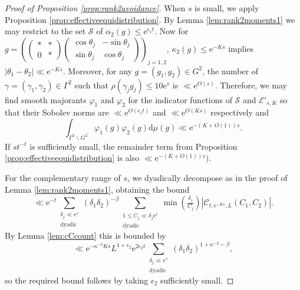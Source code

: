 \documentclass[12pt]{amsart}
\theoremstyle{definition}
\theoremstyle{remark}
\numberwithin{equation}{section}
\newcommand{\dd}{\mathrm{d}}
\newcommand{\e}{\mathrm{e}}
\newcommand{\cC}{\mathcal{C}}
\newcommand{\cE}{\mathcal{E}}
\newcommand{\cS}{\mathcal{S}}
\begin{document}
\begin{proof}[Proof of Proposition \ref{prop:rank2avoidance}]
When $s$ is small, we apply Proposition \ref{prop:effectiveequidistribution}.
By Lemma \ref{lem:rank2moments1} we may restrict to the set $\cS$ of $\alpha_2(g) \leq \e^{\epsilon_1t}$.
Now for $g = \left(
\begin{pmatrix}
  * & * \\
  0 & * 
\end{pmatrix}
\begin{pmatrix}
  \cos \theta_j & -\sin \theta_j \\
  \sin \theta_j & \cos \theta_j
\end{pmatrix}
\right)_{\!\! j=1,2}$, $\kappa_2(g)\leq \e^{-Ks}$ implies $|\theta_1 - \theta_2| \ll \e^{-Ks}$.
Moreover, for any $g = (g_1,g_2) \in G^2$, the number of $\gamma = (\gamma_1, \gamma_2) \in \Gamma^2$ such that $\rho(\gamma_jg_j) \leq 10 \e^s$ is $\ll \e^{O(s)}$.
Therefore, we may find smooth majorants $\varphi_1$ and $\varphi_2$ for the indicator functions of $\cS$ and $\cE'_{s,K}$ so that their Sobolev norms are $\ll \e^{O(\epsilon_1 t)}$ and $\ll \e^{O(K s)}$ respectively and
\begin{equation}
  \label{eq:varphijint}
  \int_{\Gamma^2\backslash G^2} \varphi_1(g)\varphi_2(g) \dd \mu(g) \ll \e^{-(K + O(1))s}.
\end{equation}
If $st^{-t}$ is sufficiently small, the remainder term from Proposition \ref{prop:effectiveequidistribution} is also $\ll\e^{-(K + O(1))s})$.

For the complementary range of $s$, we dyadically decompose as in the proof of Lemma \ref{lem:rank2moments1}, obtaining the bound
\begin{equation}
  \label{eq:avoidancedyadicdecomp}
  \ll \e^{-t}\sum_{\substack{\delta_j \ll \e^s\\ \mathrm{dyadic}}}(\delta_1 \delta_2)^{-\beta} \sum_{\substack{1\leq C_j \ll \delta_j \e^t \\ \mathrm{dyadic}}} \min(\tfrac{\delta_j}{C_j}) |\cC_{t,\e^{-Ks},L}(C_1,C_2)|.
\end{equation}
By Lemma \ref{lem:cCcount} this is bounded by
\begin{equation}
  \label{eq:avoidancedyadicdecomp1}
  \ll \e^{-\kappa^{-2}Ks} L^{1 + \epsilon_2} \e^{2\epsilon_2 t} \sum_{\substack{\delta_j \ll \e^s\\ \mathrm{dyadic}}}(\delta_1 \delta_2)^{1 + \kappa^{-2}-\beta},
\end{equation}
so the required bound follows by taking $\epsilon_2$ sufficiently small. 
\end{proof}
 
\end{document}
